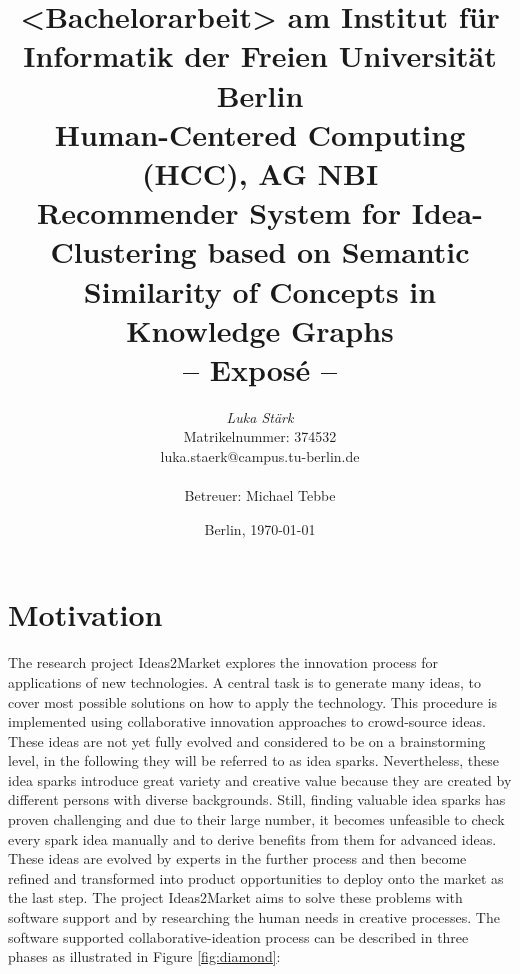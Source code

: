 \documentclass[pdftex,a4paper,12pt]{scrartcl}
\title{
{\small <Bachelorarbeit> am Institut für Informatik der Freien Universität Berlin}\\
{\small Human-Centered Computing (HCC), AG NBI}\\
[6ex]
{\LARGE Recommender System for Idea-Clustering based on Semantic Similarity of Concepts in Knowledge Graphs }\\
{\normalsize-- Exposé --}}
\author{
{\emph{\normalsize Luka Stärk}}\\
{\normalsize Matrikelnummer: 374532}\\
{\normalsize luka.staerk@campus.tu-berlin.de}\\\\
{\normalsize Betreuer: Michael Tebbe}
}
\date{\normalsize Berlin, \today}
\theoremstyle{definition}
\newcommand{\blankpage}{
\newpage
\thispagestyle{empty}
\mbox{}
\newpage
}
\begin{document}
\maketitle 



\thispagestyle{empty}  %
\blankpage

\setcounter{page}{1} %


\section{Motivation} 
    
The research project Ideas2Market explores the innovation process for applications of new technologies. A central task is to generate many ideas, to cover most possible solutions on how to apply the technology. This procedure is implemented using collaborative innovation approaches to crowd-source ideas. These ideas are not yet fully evolved and considered to be on a brainstorming level, in the following they will be referred to as idea sparks. Nevertheless, these idea sparks introduce great variety and creative value because they are created by different persons with diverse backgrounds. Still, finding valuable idea sparks has proven challenging and due to their large number, it becomes unfeasible to check every spark idea manually and to derive benefits from them for advanced ideas. These ideas are evolved by experts in the further process and then become refined and transformed into product opportunities to deploy onto the market as the last step. The project Ideas2Market aims to solve these problems with software support and by researching the human needs in creative processes. The software supported collaborative-ideation process can be described in three phases as illustrated in Figure \ref{fig:diamond}:
\end{document}
